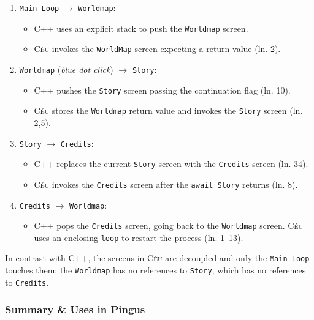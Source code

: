 \documentclass{vgtc}                          %
\newcommand{\CEU}{\textsc{C\'{e}u}\xspace}
\newcommand{\code}[1] {{\small{\texttt{#1}}}}
\begin{document}
\begin{enumerate}
\item \code{Main Loop} $\longrightarrow$ \code{Worldmap}:
    \begin{itemize}
    \item C++ uses an explicit stack to push the \code{Worldmap} screen.
    \item \CEU invokes the \code{WorldMap} screen expecting a return value
          (ln. 2).
    \end{itemize}
\item \code{Worldmap} (\emph{blue dot click}) $\longrightarrow$ \code{Story}:
    \begin{itemize}
    \item C++ pushes the \code{Story} screen passing the continuation flag
          (ln. 10).
    \item \CEU stores the \code{Worldmap} return value and invokes the \code{Story} screen
          (ln. 2,5).
    \end{itemize}
\item \code{Story} $\longrightarrow$ \code{Credits}:
    \begin{itemize}
    \item C++ replaces the current \code{Story} screen with the \code{Credits}
          screen (ln. 34).
    \item \CEU invokes the \code{Credits} screen after the \code{await Story}
          returns (ln. 8).
    \end{itemize}
\item \code{Credits} $\longrightarrow$ \code{Worldmap}:
    \begin{itemize}
    \item C++ pops the \code{Credits} screen, going back to the \code{Worldmap}
          screen.
          \CEU uses an enclosing \code{loop} to restart the process (ln. 1--13).
    \end{itemize}
\end{enumerate}

In contrast with C++, the screens in \CEU are decoupled and only the
\code{Main Loop} touches them: the \code{Worldmap} has no references to
\code{Story}, which has no references to \code{Credits}.

\subsubsection{Summary \& Uses in Pingus}
\end{document}
